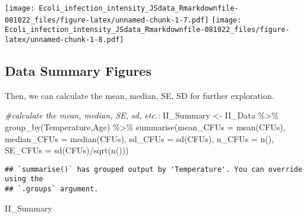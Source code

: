 \documentclass[
]{article}
\newenvironment{Shaded}{\begin{snugshade}}{\end{snugshade}}
\newcommand{\AttributeTok}[1]{\textcolor[rgb]{0.77,0.63,0.00}{#1}}
\newcommand{\CommentTok}[1]{\textcolor[rgb]{0.56,0.35,0.01}{\textit{#1}}}
\newcommand{\FunctionTok}[1]{\textcolor[rgb]{0.00,0.00,0.00}{#1}}
\newcommand{\NormalTok}[1]{#1}
\newcommand{\OtherTok}[1]{\textcolor[rgb]{0.56,0.35,0.01}{#1}}
\newcommand{\SpecialCharTok}[1]{\textcolor[rgb]{0.00,0.00,0.00}{#1}}
\begin{document}
\texttt{[image: Ecoli\_infection\_intensity\_JSdata\_Rmarkdownfile-081022\_files/figure-latex/unnamed-chunk-1-7.pdf]}
\texttt{[image: Ecoli\_infection\_intensity\_JSdata\_Rmarkdownfile-081022\_files/figure-latex/unnamed-chunk-1-8.pdf]}

\hypertarget{data-summary-figures}{%
\subsection{Data Summary Figures}\label{data-summary-figures}}

Then, we can calculate the mean, median, SE, SD for further exploration.

\begin{Shaded}
\begin{Highlighting}[]
\CommentTok{\#calculate the mean, median, SE, sd, etc.:}
\NormalTok{II\_Summary }\OtherTok{\textless{}{-}}\NormalTok{ II\_Data }\SpecialCharTok{\%\textgreater{}\%}
  \FunctionTok{group\_by}\NormalTok{(Temperature,Age) }\SpecialCharTok{\%\textgreater{}\%}
  \FunctionTok{summarise}\NormalTok{(}\AttributeTok{mean\_CFUs =} \FunctionTok{mean}\NormalTok{(CFUs),}
            \AttributeTok{median\_CFUs =} \FunctionTok{median}\NormalTok{(CFUs),}
            \AttributeTok{sd\_CFUs =} \FunctionTok{sd}\NormalTok{(CFUs),}
            \AttributeTok{n\_CFUs =} \FunctionTok{n}\NormalTok{(),}
            \AttributeTok{SE\_CFUs =} \FunctionTok{sd}\NormalTok{(CFUs)}\SpecialCharTok{/}\FunctionTok{sqrt}\NormalTok{(}\FunctionTok{n}\NormalTok{()))}
\end{Highlighting}
\end{Shaded}

\begin{verbatim}
## `summarise()` has grouped output by 'Temperature'. You can override using the
## `.groups` argument.
\end{verbatim}

\begin{Shaded}
\begin{Highlighting}[]
\NormalTok{II\_Summary}
\end{Highlighting}
\end{Shaded}
\end{document}
